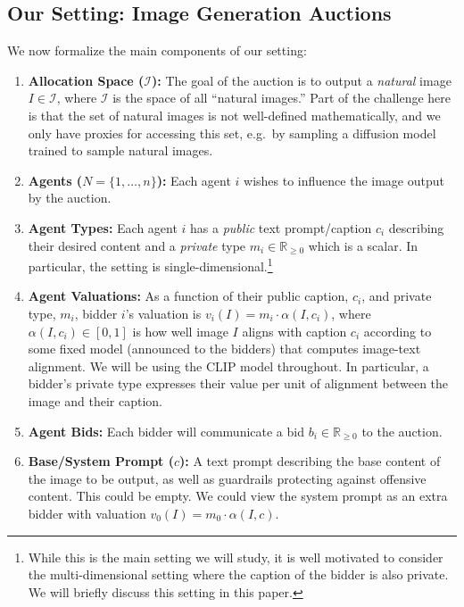 \documentclass[format=acmsmall, review=false]{acmart}
\begin{document}
\subsection{Our Setting: Image Generation Auctions}
We now formalize the main components of our setting:
\begin{enumerate}[leftmargin=6mm, nosep]
    \item \textbf{Allocation Space ($\mathcal{I}$):} The goal of the auction is to output a {\em natural} image $I \in \mathcal{I}$, where $\mathcal{I}$ is the space of all ``natural images.'' Part of the challenge here is that the set of natural images is not well-defined mathematically, and we only have proxies for accessing this set, e.g.~by sampling a diffusion model trained to sample natural images. 
     \item \textbf{Agents ($N = \{1, \dots, n\}$):} Each agent $i$ wishes to influence the image output by the auction.
    \item \textbf{Agent Types:} Each agent $i$ has a {\em public} text prompt/caption $c_i$ describing their desired content and a {\em private} type $m_i \in \mathbb{R}_{\ge 0}$ which is a scalar. In particular, the setting is single-dimensional.\footnote{While this is the main setting we will study, it is well motivated to consider the multi-dimensional setting where the caption of the bidder is also private. We will briefly discuss this setting in this paper.}
    \item \textbf{Agent Valuations:} As a function of their public caption, $c_i$, and private type, $m_i$, bidder $i$'s valuation is $v_i(I) = m_i \cdot \alpha(I,c_i)$, where $\alpha(I,c_i) \in [0,1]$ is how well image $I$ aligns with caption $c_i$ according to some fixed model (announced to the bidders) that computes image-text alignment. We will be using the CLIP model throughout. In particular, a bidder's private type expresses their value per unit of alignment between the image and their caption.
    \item \textbf{Agent Bids:} Each bidder will communicate a bid $b_i \in \mathbb{R}_{\ge 0}$ to the auction.
    \item \textbf{Base/System Prompt ($c$):} A text prompt describing the base content of the image to be output, as well as guardrails protecting against offensive content. This could be empty. We could view the system  prompt as an extra bidder with valuation $v_0(I)=m_0 \cdot \alpha(I,c)$.

\end{enumerate}
\end{document}
